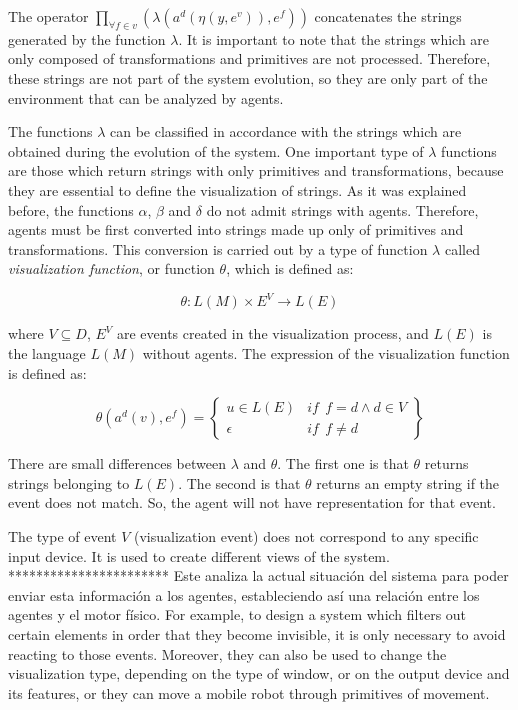 \documentclass[runningheads]{llncs}
\begin{document}
The operator $\underset{\forall f \in v}{ \prod }(\lambda (a^d (\eta (y, e^v)), e^f))$ concatenates
the strings generated by the function $\lambda$. It is important to note that the strings which are
only composed of transformations and primitives are not processed. Therefore, these strings are not
part of the system evolution, so they are only part of the environment that can be analyzed by agents.
	
The functions $\lambda$ can be classified in accordance with the strings which are obtained during
the evolution of the system. One important type of $\lambda$ functions are those which return
strings with only primitives and transformations, because they are essential to define the
visualization of strings. As it was explained before, the functions $\alpha$, $\beta$ and $\delta$ do
not admit strings with agents. Therefore, agents must be first converted into strings made up only
of primitives and transformations. This conversion is carried out by a type of function $\lambda$
called \textit{visualization function}, or function $\theta$, which is defined as:


\begin{equation}
    \theta: L(M) \times E^V \rightarrow L(E)
\end{equation}


where $V \subseteq D$, $E^V$ are events created in the visualization process, and $L(E)$
is the language $L(M)$ without agents. The expression of the visualization function is defined as:


\begin{equation}
    \theta (a^d(v), e^f) =
    \left\{
    \begin{array}{ll}
        u \in L(E) & \mathit{if}  \ \ f = d \wedge d \in V \\
        \epsilon  & \mathit{if}  \ \ f \neq d
    \end{array}\right\}
\end{equation}

There are small differences between $\lambda$ and $\theta$. The first one is that $\theta$ returns
strings belonging to $L(E)$. The second is that $\theta$ returns an empty string if the event does
not match. So, the agent will not have representation for that event.

The type of event $V$ (visualization event) does not correspond to any specific input device. It is used 
to create different views of the system. *********************** Este analiza la actual situación del sistema para poder enviar esta información a los agentes, estableciendo así una relación entre los agentes y el motor físico. For example, to design a system which filters out certain elements in order that they become invisible, it is only necessary to avoid reacting to those events. Moreover, they can also be used to change the visualization type, depending on the type of window, or on the output device and its features, or they can move a mobile robot through primitives of movement.
\end{document}
